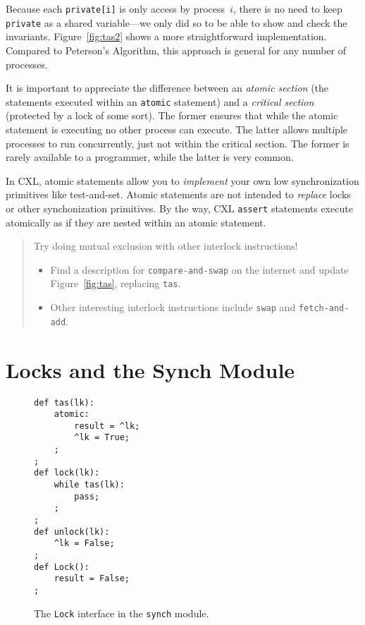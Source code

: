 \documentclass{report}
\newenvironment{code}{
\tcolorbox
}{
\endtcolorbox
}
\begin{document}
Because each \texttt{private[i]} is only access by process~$i$,
there is no need to keep \texttt{private} as a shared
variable---we only did so to be able to show and check the invariants.
Figure~\ref{fig:tas2} shows a more straightforward implementation.
Compared to Peterson's Algorithm, this approach is general for
any number of processes.

It is important to appreciate the difference between an
\emph{atomic section} (the statements executed within an
\texttt{atomic} statement) and a \emph{critical section}
(protected by a lock of some sort).
The former ensures that while the
atomic statement is executing no other process can execute.
The latter allows multiple processes to run concurrently,
just not within the critical section.
The former is rarely available to a programmer, while the latter
is very common.

In CXL, atomic statements allow you to \emph{implement} your own
low synchronization primitives like test-and-set.  Atomic statements
are not intended to \emph{replace} locks or other synchonization primitives.
By the way, CXL \texttt{assert} statements execute atomically
as if they are nested within an atomic statement.

\begin{quote}
Try doing mutual exclusion with other interlock instructions!
\begin{itemize}
\item Find a description for \texttt{compare-and-swap} on the internet and
update Figure~\ref{fig:tas}, replacing \texttt{tas}.
\item Other interesting interlock instructions include \texttt{swap} and
\texttt{fetch-and-add}.
\end{itemize}
\end{quote}

\chapter{Locks and the Synch Module}

\begin{figure}
\begin{code}
\begin{verbatim}
def tas(lk):
    atomic:
        result = ^lk;
        ^lk = True;
    ;
;
def lock(lk):
    while tas(lk):
        pass;
    ;
;
def unlock(lk):
    ^lk = False;
;
def Lock():
    result = False;
;
\end{verbatim}
\end{code}
\caption{The \texttt{Lock} interface in the \texttt{synch} module.}
\label{fig:locks}
\end{figure}
\end{document}
